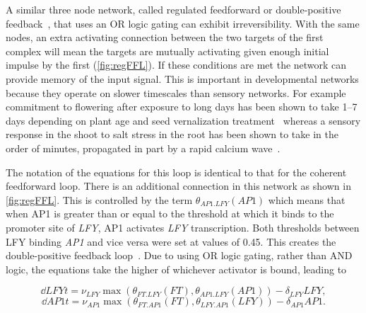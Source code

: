 A similar three node network, called regulated feedforward or double-positive feedback~\cite{alon2006}, that uses an OR logic gating can exhibit irreversibility.
With the same nodes, an extra activating connection between the two targets of the first complex will mean the targets are mutually activating given enough initial impulse by the first (\autoref{fig:regFFL}).
If these conditions are met the network can provide memory of the input signal.
This is important in developmental networks because they operate on slower timescales than sensory networks.
For example commitment to flowering after exposure to long days has been shown to take 1--7 days depending on plant age and seed vernalization treatment~\cite{corbesier1996} whereas a sensory response in the shoot to salt stress in the root has been shown to take in the order of minutes, propagated in part by a rapid calcium wave~\cite{choi2014}.

The notation of the equations for this loop is identical to that for the coherent feedforward loop.
There is an additional connection in this network as shown in \autoref{fig:regFFL}.
This is controlled by the term $\theta_{AP1.LFY} (AP1)$ which means that when AP1 is greater than or equal to the threshold at which it binds to the promoter site of \emph{LFY}, AP1 activates \emph{LFY} transcription.
Both thresholds between LFY binding \emph{AP1} and vice versa were set at values of 0.45.
This creates the double-positive feedback loop~\cite{alon2006}.
Due to using OR logic gating, rather than AND logic, the equations take the higher of whichever activator is bound, leading to

\begin{equation*}
\dd{LFY}{t} = \nu_{LFY}\max\left(\theta_{FT.LFY} (FT),\theta_{AP1.LFY} (AP1)\right) - \delta_{LFY}LFY,
\end{equation*}
\begin{equation*}
\dd{AP1}{t} = \nu_{AP1}\max\left(\theta_{FT.AP1} (FT),\theta_{LFY.AP1} (LFY)\right) - \delta_{AP1}AP1.
\end{equation*}

